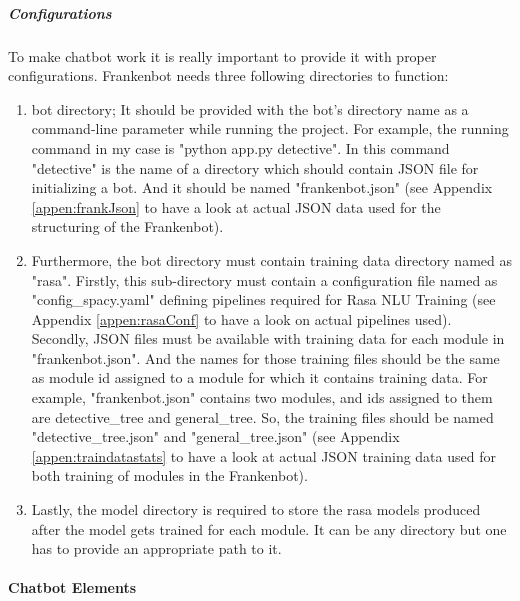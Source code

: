 \subparagraph*{Configurations \label{par:config}}
To make chatbot work it is really important to provide it with proper configurations. Frankenbot needs three following directories to function:
\begin{enumerate}
    \item bot directory; It should be provided with the bot's directory name as a command-line parameter while running the project. For example, the running command in my case is "python app.py detective". In this command "detective" is the name of a directory which should contain JSON file for initializing a bot. And it should be named "frankenbot.json" (see Appendix \ref{appen:frankJson} to have a look at actual JSON data used for the structuring of the Frankenbot). 
    \item Furthermore, the bot directory must contain training data directory named as "rasa". Firstly, this sub-directory must contain a configuration file named as "config\_spacy.yaml" defining pipelines required for Rasa NLU Training\cite{rasapipeline} (see Appendix \ref{appen:rasaConf} to have a look on actual pipelines used). Secondly, JSON files must be available with training data for each module in "frankenbot.json". And the names for those training files should be the same as module id assigned to a module for which it contains training data. For example, "frankenbot.json" contains two modules, and ids assigned to them are detective\_tree and general\_tree. So, the training files should be named "detective\_tree.json" and "general\_tree.json" (see Appendix \ref{appen:traindatastats} to have a look at actual JSON training data used for both training of modules in the Frankenbot).
    \item Lastly, the model directory is required to store the rasa models produced after the model gets trained for each module. It can be any directory but one has to provide an appropriate path to it.
\end{enumerate} 

\paragraph*{Chatbot Elements}

